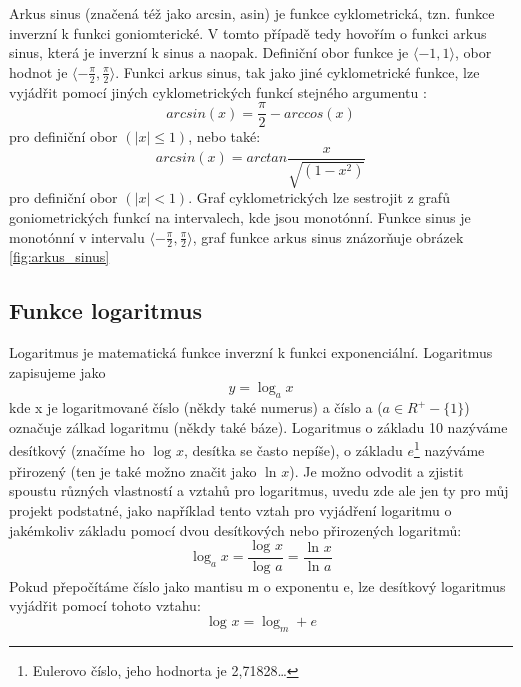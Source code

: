 \documentclass[12pt,a4paper,titlepage,final]{article}
\begin{document}
Arkus sinus (značená též jako arcsin, asin) je funkce cyklometrická, tzn. 
funkce inverzní k funkci goniomterické. V tomto případě tedy hovořím o 
funkci arkus sinus, která je inverzní k sinus a naopak.
Definiční obor funkce je $\langle-1, 1\rangle$, obor hodnot je 
$\langle-\frac{\pi}{2},\frac{\pi}{2}\rangle$.
Funkci arkus sinus, tak jako jiné cyklometrické funkce, lze vyjádřit pomocí
jiných cyklometrických funkcí stejného argumentu \cite{vzorce}:
\begin{equation}\label{eq:arcsin_arccos}
arcsin(x) = \frac{\pi}{2}-arccos(x)
\end{equation}
pro definiční obor $(|x|\le 1)$, nebo také:
\begin{equation}\label{eq:arcsin_arctan}
arcsin(x) = arctan\frac{x}{\sqrt{(1-x^2)}}
\end{equation}
pro definiční obor $(|x|<1)$.
Graf cyklometrických lze sestrojit z grafů goniometrických funkcí na
intervalech, kde jsou monotónní. Funkce sinus je monotónní v intervalu
$\langle-\frac{\pi}{2}, \frac{\pi}{2}\rangle$, graf funkce arkus sinus
znázorňuje obrázek \ref{fig:arkus_sinus}

\subsection{Funkce logaritmus}

Logaritmus je matematická funkce inverzní k funkci exponenciální.
Logaritmus zapisujeme jako
\begin{equation}\label{eq:logaritmus}
y=\log_{a}x
\end{equation}
kde x je logaritmované číslo (někdy také numerus) a číslo a
($a\in R^{+}-\{1\}$) označuje zálkad logaritmu (někdy také báze). Logaritmus
o základu 10 nazýváme desítkový (značíme ho $\log_{}x$, desítka se často nepíše),
o základu $e$\footnote{Eulerovo číslo,
jeho hodnorta je 2,71828\dots} nazýváme přirozený (ten je také možno
značit jako $\ln_{}x$).
Je možno odvodit a zjistit spoustu různých vlastností a vztahů pro logaritmus, 
uvedu zde ale jen ty pro můj projekt podstatné, jako například tento vztah \cite{tabulky}
pro vyjádření logaritmu o jakémkoliv základu pomocí dvou desítkových nebo
přirozených logaritmů:
\begin{equation}\label{eq:logaritmus2}
\log_{a}x=\frac{\log_{}x}{\log_{}a}=\frac{\ln_{}x}{\ln_{}a}
\end{equation}
Pokud přepočítáme číslo jako mantisu m o exponentu e, lze desítkový logaritmus
vyjádřit pomocí tohoto vztahu:
\begin{equation}\label{eq:logaritmus3}
\log_{}x=\log_{m}+e
\end{equation}
\end{document}
